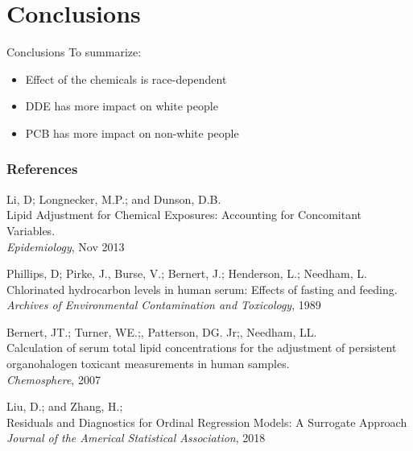 \documentclass{beamer}
\begin{document}

\section{Conclusions}
\begin{frame}{Conclusions}
To summarize:
\begin{itemize}
	\item Effect of the chemicals is race-dependent
	\item DDE has more impact on white people
	\item PCB has more impact on non-white people
\end{itemize}
\end{frame}


\begin{frame}
\frametitle{References}
\footnotesize{
	\begin{thebibliography}{99} %
		
		 Li, D; Longnecker, M.P.; and Dunson, D.B. \\
		\newblock Lipid Adjustment for Chemical Exposures: Accounting for Concomitant Variables.\\
		\newblock \emph{Epidemiology}, Nov 2013
		
		Phillips, D; Pirke, J., Burse, V.; Bernert, J.; Henderson, L.; Needham, L.\\
		\newblock Chlorinated hydrocarbon levels in human serum: Effects of fasting and feeding.\\
		\newblock \emph{Archives of Environmental Contamination and Toxicology}, 1989
		
		 Bernert, JT.; Turner, WE.;, Patterson, DG. Jr;, Needham, LL.\\
		\newblock Calculation of serum total lipid concentrations for the adjustment of persistent organohalogen toxicant measurements in human samples.\\
		\newblock \emph{Chemosphere}, 2007
		
		 Liu, D.; and Zhang, H.;\\
		\newblock Residuals and Diagnostics for Ordinal Regression Models: A Surrogate Approach\\
		\newblock \emph{Journal of the Americal Statistical Association}, 2018
		
	\end{thebibliography}
}
\end{frame}
\appendix
\end{document}

